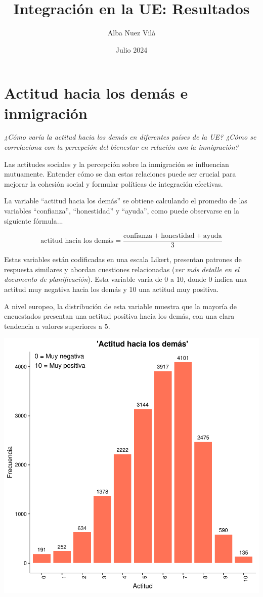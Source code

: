 \documentclass{article}
\title{Integración en la UE: Resultados}
\author{Alba Nuez Vilà}
\date{Julio 2024}
\begin{document}
\maketitle

\section{Actitud hacia los demás e inmigración}

\begin{center}
\emph{¿Cómo varía la actitud hacia los demás en diferentes países de la UE? ¿Cómo se correlaciona con la percepción del bienestar en relación con la inmigración?}
\end{center}

Las actitudes sociales y la percepción sobre la inmigración se influencian mutuamente. Entender cómo se dan estas relaciones puede ser crucial para mejorar la cohesión social y formular políticas de integración efectivas.

La variable ``actitud hacia los demás'' se obtiene calculando el promedio de las variables ``confianza'', ``honestidad'' y ``ayuda'', como puede observarse en la siguiente fórmula...

\[
\text{actitud hacia los demás} = \frac{\text{confianza} + \text{honestidad} + \text{ayuda}}{3}
\]

Estas variables están codificadas en una escala Likert, presentan patrones de respuesta similares y abordan cuestiones relacionadas (\textit{ver más detalle en el documento de planificación}). Esta variable varía de 0 a 10, donde 0 indica una actitud muy negativa hacia los demás y 10 una actitud muy positiva.

A nivel europeo, la distribución de esta variable muestra que la mayoría de encuestados presentan una actitud positiva hacia los demás, con una clara tendencia a valores superiores a 5.

\includegraphics{Informe_resultados-histogram}
\end{document}
